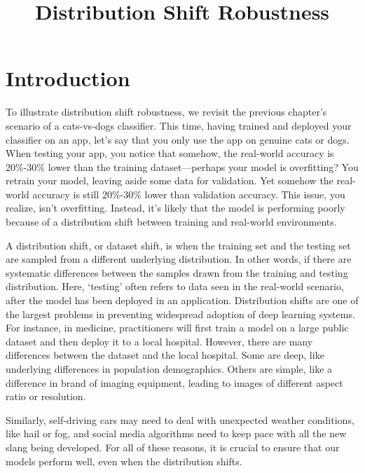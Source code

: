 \documentclass{article}
\title{Distribution Shift Robustness}
\begin{document}
\maketitle

\section{Introduction}
To illustrate distribution shift robustness, we revisit the previous chapter's scenario of a cats-vs-dogs classifier. This time, having trained and deployed your classifier on an app, let's say that you only use the app on genuine cats or dogs. When testing your app, you notice that somehow, the real-world accuracy is 20\%-30\% lower than the training dataset—perhaps your model is overfitting? You retrain your model, leaving aside some data for validation. Yet somehow the real-world accuracy is still 20\%-30\% lower than validation accuracy. This issue, you realize, isn't overfitting. Instead, it's likely that the model is performing poorly because of a distribution shift between training and real-world environments.

A distribution shift, or dataset shift, is when the training set and the testing set are sampled from a different underlying distribution. In other words, if there are systematic differences between the samples drawn from the training and testing distribution. Here, `testing' often refers to data seen in the real-world scenario, after the model has been deployed in an application. Distribution shifts are one of the largest problems in preventing widespread adoption of deep learning systems. For instance, in medicine, practitioners will first train a model on a large public dataset and then deploy it to a local hospital. However, there are many differences between the dataset and the local hospital. Some are deep, like underlying differences in population demographics. Others are simple, like a difference in brand of imaging equipment, leading to images of different aspect ratio or resolution. 

Similarly, self-driving cars may need to deal with unexpected weather conditions, like hail or fog, and social media algorithms need to keep pace with all the new slang being developed. For all of these reasons, it is crucial to ensure that our models perform well, even when the distribution shifts.
\end{document}
